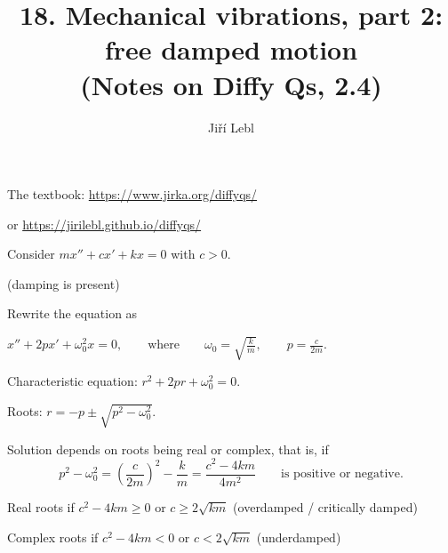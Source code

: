 \documentclass[10pt,aspectratio=169]{beamer}
\author{Ji\v{r}\'i Lebl}
\institute[OSU]{%
Oklahoma State University%
}
\title{18. Mechanical vibrations, part 2: free damped motion\\(Notes on Diffy Qs, 2.4)}
\date{}
\begin{document}
\begin{frame}
\titlepage


\begin{center}
The textbook: \url{https://www.jirka.org/diffyqs/}

or \url{https://jirilebl.github.io/diffyqs/}
\end{center}
\end{frame}

\begin{frame}
\hfill{}

\vspace*{-0.8in}

Consider 
\quad
$m x'' + c x' + kx = 0$
\quad
with $c > 0$.

(damping is present)

\medskip
\pause

Rewrite the equation as

\medskip

\qquad
$\displaystyle
x'' + 2p x' + \omega_0^2 x = 0,
\qquad
\text{where}
\qquad
\omega_0 = \sqrt{\frac{k}{m}}, \qquad p = \frac{c}{2m} .
$

\pause
\medskip

Characteristic equation:
\quad $r^2 + 2 pr + \omega_0^2 = 0$.

\pause
\medskip

Roots:
\quad $r = -p \pm \sqrt{p^2 - \omega_0^2}$.

\medskip
\pause

Solution depends on roots being real or complex, that is, if
\[
p^2 - \omega_0^2 = {\left( \frac{c}{2m} \right)}^2 - \frac{k}{m}
= \frac{c^2 - 4km}{4m^2}
\qquad
\text{is positive or negative.}
\]

\medskip
\pause

Real roots if \quad $c^2 - 4km \geq 0$ \quad or \quad $c \geq 2\sqrt{km}$ \quad
(overdamped / critically damped)

\medskip
\pause

Complex roots if \quad $c^2 - 4km < 0$ \quad or \quad $c < 2\sqrt{km}$ \quad
(underdamped)

\end{frame}
\end{document}
